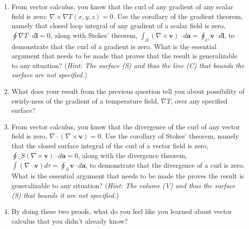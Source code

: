 \documentclass[11pt]{article}
\def\tightlist{}
\begin{document}
\begin{enumerate}
\def\labelenumi{\arabic{enumi}.}
\tightlist
\item
  From vector calculus, you know that the curl of any gradient of any
  scalar field is zero: $\nabla \times \nabla T(x,y,z) = 0 $. Use the
  corollary of the gradient theorem, namely that closed loop integral of
  any gradient of a scalar field is zero,
  \(\oint \nabla T\cdot d\mathbf{l} = 0\), along with Stokes' theorem,
  \(\int_S(\nabla \times \mathbf{v})\cdot d\mathbf{a} = \oint_C \mathbf{v}\cdot d\mathbf{l}\),
  to demonstrate that the curl of a gradient is zero. What is the
  essential argument that needs to be made that proves that the result
  is generalizable to any situation? (\emph{Hint: The surface (S) and
  thus the line (C) that bounds the surface are not specified.})
\item
  What does your result from the previous question tell you about
  possibility of swirly-ness of the gradient of a temperature field,
  \(\nabla T\), over any specified surface?
\item
  From vector calculus, you know that the divergence of the curl of any
  vector field is zero, \(\nabla \cdot (\nabla \times \mathbf{v}) = 0\).
  Use the corollary of Stokes' theorem, namely that the closed surface
  integral of the curl of a vector field is zero, $\oint\_S
  (\nabla \times \mathbf{v})\cdot d\mathbf{a} = 0 $, along with the
  divergence theorem,
  \(\int(\nabla \cdot \mathbf{v}) d\tau = \oint_S \mathbf{v}\cdot d\mathbf{a}\),
  to demonstrate that the divergence of a curl is zero. What is the
  essential argument that needs to be made the proves the result is
  generalizable to any situation? (\emph{Hint: The volume (V) and thus
  the surface (S) that bounds it are not specified.})
\item
  By doing these two proofs, what do you feel like you learned about
  vector calculus that you didn't already know?
\end{enumerate}
\end{document}
